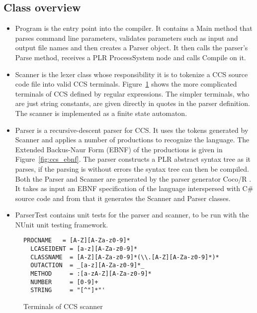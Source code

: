 \subsection{Class overview}\label{ccs_class_overview}
	\begin{itemize}
	
	\item \textsf{Program} is the entry point into the compiler. It contains a 
	\textsf{Main} method that parses command line parameters, validates 
	parameters such as input and output file names and then creates a 
	\textsf{Parser} object. It then calls the parser's \textsf{Parse} method, 
	receives a PLR \textsf{ProcessSystem} node and calls \textsf{Compile} on it. 
	
	\item \textsf{Scanner} is the lexer class whose responsibility it is to 
	tokenize a CCS source code file into valid CCS terminals. 
	Figure~\ref{fig:ccs_terminals} shows the more complicated terminals of CCS 
	defined by regular expressions. The simpler terminals, who are just string 
	constants, are given directly in quotes in the parser definition. The 
	scanner is implemented as a finite state automaton.
	
  \item \textsf{Parser} is a recursive-descent parser for CCS. It uses the 
  tokens generated by \textsf{Scanner} and applies a number of 
  \textsf{productions} to recognize the language. The Extended Backus-Naur 
  Form (EBNF) of the productions is given in Figure~\ref{fig:ccs_ebnf}. The 
  parser constructs a PLR abstract syntax tree as it parses, if the parsing is 
  without errors the syntax tree can then be compiled. Both the 
  \textsf{Parser} and \textsf{Scanner} are generated by the parser generator 
  Coco/R \cite{cocor}. It takes as input an EBNF specification of the language 
  interspersed with C\# source code and from that it generates the 
  \textsf{Scanner} and \textsf{Parser} classes. 
	
	\item \textsf{ParserTest} contains unit tests for the parser and scanner, to 
	be run with the NUnit unit testing framework.
	
	\end{itemize}
	
	\begin{figure}
	\label{fig:ccs_terminals}
	\caption{Terminals of CCS scanner}
	
\lstset{showtabs=false,showspaces=false,showstringspaces=false}
\begin{lstlisting}[frame=trbl,basicstyle=\scriptsize\ttfamily,showtabs=false,showspaces=false]
  PROCNAME   = [A-Z][A-Za-z0-9]*
  LCASEIDENT = [a-z][A-Za-z0-9]*
  CLASSNAME  = [A-Z][A-Za-z0-9]*(\\.[A-Z][A-Za-z0-9]*)*
  OUTACTION  = _[a-z][A-Za-z0-9]*_
  METHOD     = :[a-zA-Z][A-Za-z0-9]*
  NUMBER     = [0-9]+
  STRING     = "[^"]*"'
  \end{lstlisting}
	\end{figure}
	
